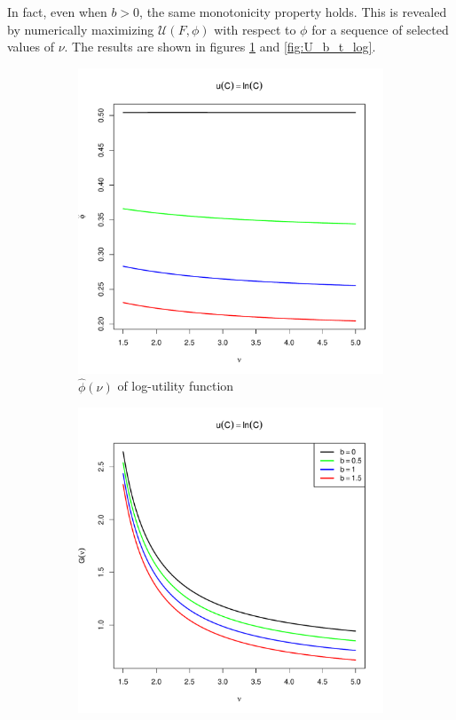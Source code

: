 \documentclass{article}
\begin{document}
In fact, even when $b > 0$, the same monotonicity property holds. This
is revealed by numerically maximizing $\mathcal U(F, \phi)$ with
respect to $\phi$ for a sequence of selected values of $\nu$. The
results are shown in figures \ref{fig:phi_hat_t_log} and
\ref{fig:U_b_t_log}.
\begin{figure}[htb!]
  \begin{subfigure}[b]{0.5\linewidth}
    \includegraphics[width=\textwidth]{phi_hat_b_t_log.pdf}
    \caption{$\hat\phi(\nu)$ of log-utility function}
    \label{fig:phi_hat_t_log}
  \end{subfigure}
  \begin{subfigure}[b]{0.5\linewidth}
    \includegraphics[width=\textwidth]{U_b_t_log.pdf}

\end{subfigure}
\end{figure}
\end{document}
